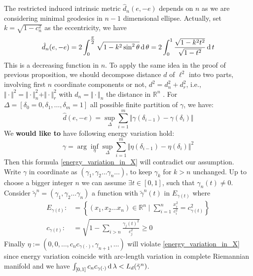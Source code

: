 \begin{rmk}
\begin{enumerate}
		      The restricted induced intrinsic metric $\hat{d}_n(e,-e)$ depends on $n$ as we are considering minimal geodesics in $n-1$ dimensional ellipse. Actually, set $k=\sqrt{1-c_n^2}$ as the eccentricity, we have
		      \[
			      \hat{d}_n(e,-e)= 2\int _{0}^{\tfrac {\pi }{2}}{\sqrt {1-k^{2}\sin ^{2}\theta }}\operatorname{d} \theta = 2\int _{0}^{1}{\frac {\sqrt {1-k^{2}t^{2}}}{\sqrt {1-t^{2}}}}\operatorname{d} t
		      \]
		      This is a decreasing function in $n$.	To apply the same idea in the proof of previous proposition, we should decompose distance $d$ of $\ell^2$ into two parts, involving first $n$ coordinate components or not, $d^2=d_n^2+d_r^2$, i.e., $\Vert \cdot \Vert^2 = \Vert \cdot \Vert_n^2 + \Vert \cdot \Vert_r^2$ with $d_n=\Vert \cdot \Vert_n$ the distance in $\mathbb{R} ^n $ . For $\Delta=[\delta_0=0,\delta_1, \ldots, \delta_m=1]$ all possible finite partition of $\gamma$, we have:
		      \[
			      \hat{d}(e,-e)=\sup_{\Delta} \sum_{i=1}^{m} \Vert\gamma(\delta_{i-1}) - \gamma(\delta_{i})\Vert
		      \]
		      We \textbf{would like to} have following energy variation hold:
		      \begin{equation}
			      \label{energy_variation_in_X}
			      \gamma = \operatorname{arg} \inf_{\eta} \sup_{\Delta} \sum_{i=1}^{m} \Vert\eta(\delta_{i-1})- \eta(\delta_{i})\Vert^2
		      \end{equation}
		      Then this formula \ref{energy_variation_in_X} will contradict our assumption. Write $\gamma$ in coordinate as $(\gamma_1, \gamma_2\ldots\gamma_n\ldots)$, to keep $\gamma_k$ for $ k > n$ unchanged. Up to choose a bigger integer $n$ we can assume $ \exists t \in [0,1]$, such that $\gamma_n(t) \neq 0$. Consider $\tilde{\gamma}^n = (\gamma_1, \gamma_2 \ldots \gamma_n)$ a function with $\tilde\gamma^n(t)$ in $E_{\gamma(t)}$ where
		      \begin{align*}
			      E_{\gamma(t)} : & = \left\{ (x_1,x_2 \ldots x_n) \in \mathbb{R}^n \mid \sum_{i=1}^n \frac{x_i^2}{ c_i^2} = c_{\gamma(t)}^2\right\} \\
			      c_{\gamma(t)}:  & =\sqrt{ 1- \sum_{i > n} \frac{\gamma_j(t)^2}{c_j^2}} \geq 0
		      \end{align*}
		      Finally $\eta := (0,0,\ldots, c_n c_{\gamma(\cdot)},\gamma_{n+1},\ldots)$ will violate \ref{energy_variation_in_X} since energy variation coincide with arc-length variation in complete Riemannian manifold and we have $\int_{[0,1]} c_n c_{\gamma(\cdot)} \operatorname{d} \lambda < L_d(\tilde{\gamma}^n)$.


\end{enumerate}
\end{rmk}
